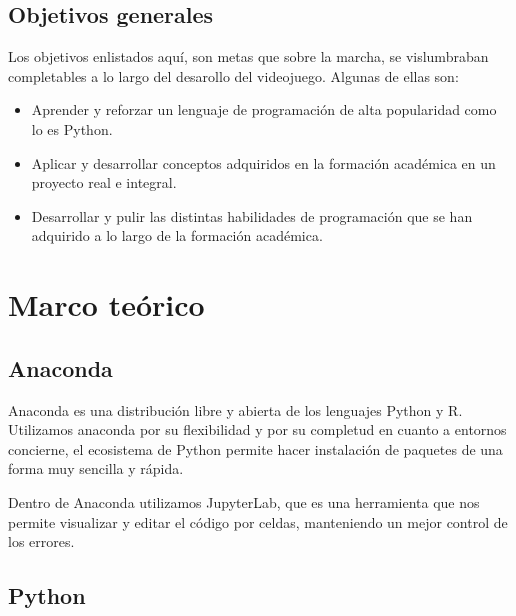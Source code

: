 \documentclass[12pt,letterpaper]{report}
\begin{document}
\section{Objetivos generales}

Los objetivos enlistados aquí, son metas que sobre la marcha, se vislumbraban completables a lo largo del desarollo del videojuego. Algunas de ellas son:

\begin{itemize}

\item Aprender y reforzar un lenguaje de programación de alta popularidad como lo es Python.

\item Aplicar y desarrollar conceptos adquiridos en la formación académica en un proyecto real e integral.

\item Desarrollar y pulir las distintas habilidades de programación que se han adquirido a lo largo de la formación académica.


\end{itemize}


%
%
%
%
%
%



\chapter{Marco teórico}

\section{Anaconda}

Anaconda es una distribución libre y abierta de los lenguajes Python y R. Utilizamos anaconda por su flexibilidad y por su completud en cuanto a entornos concierne, el ecosistema de Python permite hacer instalación de paquetes de una forma  muy sencilla y rápida. 

Dentro de Anaconda utilizamos JupyterLab, que es una herramienta que nos permite visualizar y editar el código por celdas, manteniendo un mejor control de los errores.



\section{Python}
\end{document}
